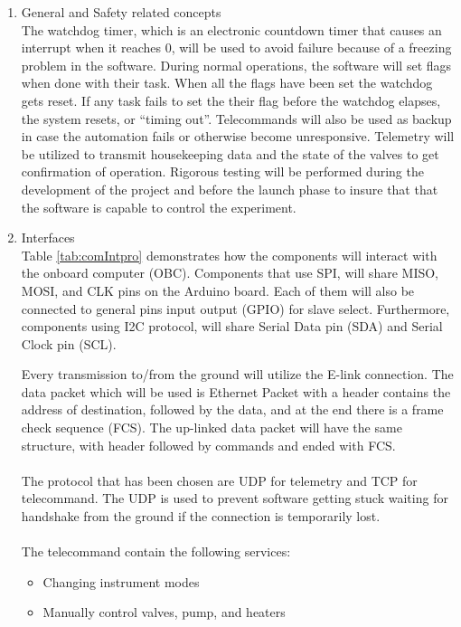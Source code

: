 \begin{enumerate}[label=(\alph*)]
\item{General and Safety related concepts}\\
The watchdog timer, which is an electronic countdown timer that causes an interrupt when it reaches 0, will be used to avoid failure because of a freezing problem in the software. During normal operations, the software will set flags when done with their task. When all the flags have been set the watchdog gets reset. If any task fails to set the their flag before the watchdog elapses, the system resets, or \enquote{timing out}. Telecommands will also be used as backup in case the automation fails or otherwise become unresponsive. Telemetry will be utilized to transmit housekeeping data and the state of the valves to get confirmation of operation. Rigorous testing will be performed during the development of the project and before the launch phase to insure that that the software is capable to control the experiment.
\item{Interfaces}\\
Table \ref{tab:comIntpro} demonstrates how the components will interact with the onboard computer (OBC). Components that use SPI, will share MISO, MOSI, and CLK pins on the Arduino board. Each of them will also be connected to general pins input output (GPIO) for slave select. Furthermore, components using I2C protocol, will share Serial Data pin (SDA) and Serial Clock pin (SCL).



Every transmission to/from the ground will utilize the E-link connection. The data packet which will be used is Ethernet Packet with a header contains the address of destination, followed by the data, and at the end there is a frame check sequence (FCS). The up-linked data packet will have the same structure, with header followed by commands and ended with FCS.\\
\\
The protocol that has been chosen are UDP for telemetry and TCP for telecommand. The UDP is used to prevent software getting stuck waiting for handshake from the ground if the connection is temporarily lost.\\
\\
The telecommand contain the following services:
\begin{itemize}
    \item Changing instrument modes
    \item Manually control valves, pump, and heaters
\end{itemize}


\end{enumerate}
